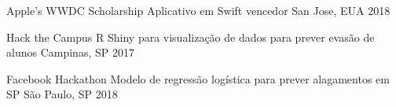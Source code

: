 \begin{cvhonors}

  \cvhonor
    {Apple's WWDC Scholarship}
    {Aplicativo em Swift vencedor}
    {San Jose, EUA}
    {2018}


  \cvhonor
    {Hack the Campus}
    {R Shiny para visualização de dados para prever evasão de alunos}
    {Campinas, SP}
    {2017}





  \cvhonor
    {Facebook Hackathon}
    {Modelo de regressão logística para prever alagamentos em SP}
    {São Paulo, SP}
    {2018}



\end{cvhonors}
